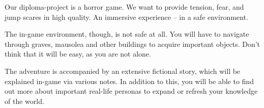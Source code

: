 Our diploma-project is a horror game. We want to provide tension, fear, and jump scares in high quality. An immersive experience – in a safe environment.

The in-game environment, though, is not safe at all. You will have to navigate through graves, mausolea and other buildings to acquire important objects. Don’t think that it will be easy, as you are not alone.

The adventure is accompanied by an extensive fictional story, which will be explained in-game via various notes. In addition to this, you will be able to find out more about important real-life personas to expand or refresh your knowledge of the world.

%
%
